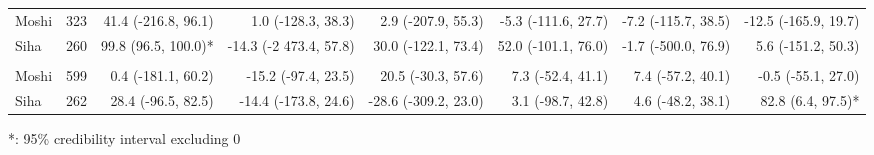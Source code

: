 \begin{table}[t]
\begin{tabular*}{\linewidth}{@{\extracolsep{\fill}}l|rrrrrrr}
\midrule\addlinespace[2.5pt]
\multicolumn{8}{l}{Leprosy} \\[2.5pt] 
\midrule\addlinespace[2.5pt]
Moshi & 323 & 41.4 (-216.8, 96.1)  & 1.0 (-128.3, 38.3)  & 2.9 (-207.9, 55.3)  & -5.3 (-111.6, 27.7)  & -7.2 (-115.7, 38.5)  & -12.5 (-165.9, 19.7)  \\ 
Siha & 260 & 99.8 (96.5, 100.0)* & -14.3 (-2 473.4, 57.8)  & 30.0 (-122.1, 73.4)  & 52.0 (-101.1, 76.0)  & -1.7 (-500.0, 76.9)  & 5.6 (-151.2, 50.3)  \\ 
\midrule\addlinespace[2.5pt]
\multicolumn{8}{l}{Schistosomiasis} \\[2.5pt] 
\midrule\addlinespace[2.5pt]
Moshi & 599 & 0.4 (-181.1, 60.2)  & -15.2 (-97.4, 23.5)  & 20.5 (-30.3, 57.6)  & 7.3 (-52.4, 41.1)  & 7.4 (-57.2, 40.1)  & -0.5 (-55.1, 27.0)  \\ 
Siha & 262 & 28.4 (-96.5, 82.5)  & -14.4 (-173.8, 24.6)  & -28.6 (-309.2, 23.0)  & 3.1 (-98.7, 42.8)  & 4.6 (-48.2, 38.1)  & 82.8 (6.4, 97.5)* \\ 
\bottomrule
\end{tabular*}
\begin{minipage}{\linewidth}
*: 95\% credibility interval excluding 0\\
\end{minipage}
\end{table}

